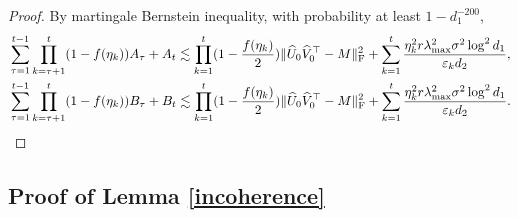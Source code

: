 \documentclass[12pt]{article}
\newcommand\fro[1]{\| #1 \|_{\rm{F}}}
\theoremstyle{plain}
\begin{document}
\begin{proof}
    By martingale Bernstein inequality, with probability at least $1-d_1^{-200}$,  
    \begin{align*}
        &\sum_{\tau=1}^{t-1}\prod_{k=\tau+1}^{t} (1-f(\eta_k))A_{\tau}+A_t \lesssim \prod_{k=1}^{t} (1-\frac{f(\eta_k)}{2}) \fro{\widehat{U}_0\widehat{V}_0^{\top}-M}^2 + \sum_{k=1}^{t}\frac{\eta_k^2r\lambda_{\max}^2\sigma^2\log^2d_1}{\varepsilon_kd_2}, \\
        &\sum_{\tau=1}^{t-1}\prod_{k=\tau+1}^{t} (1-f(\eta_k))B_{\tau}+B_t \lesssim \prod_{k=1}^{t} (1-\frac{f(\eta_k)}{2}) \fro{\widehat{U}_0\widehat{V}_0^{\top}-M}^2 + \sum_{k=1}^{t}\frac{\eta_k^2r\lambda_{\max}^2\sigma^2\log^2d_1}{\varepsilon_kd_2}.
    \end{align*}
\end{proof}

\subsection{Proof of Lemma \ref{incoherence}}
\end{document}
